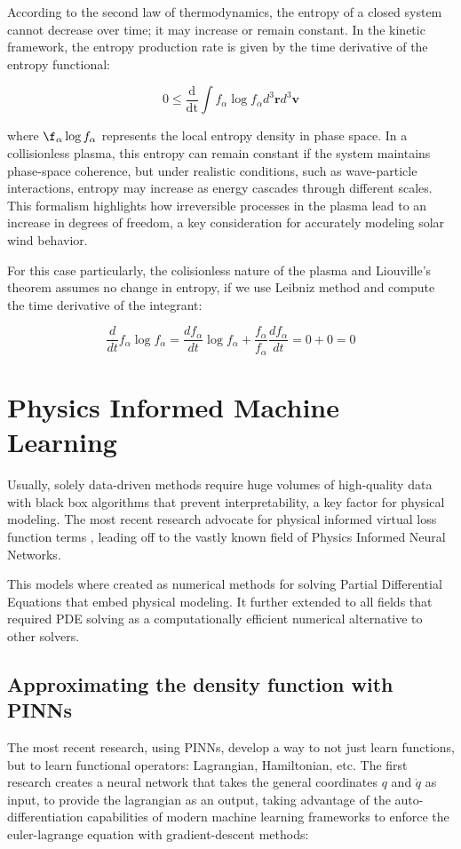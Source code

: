 \documentclass[12pt]{article}
\begin{document}
According to the second law of thermodynamics, the entropy of a closed system cannot decrease over time; it may increase or remain constant. In the kinetic framework, the entropy production rate is given by the time derivative of the entropy functional:

\begin{equation}
    0 \leq \frac{\mathrm{d}}{\mathrm{dt}} \int f_\alpha \log f_\alpha d^3\mathbf{r} d^3\mathbf{v}
\end{equation}

where $\f_\alpha \log f_\alpha$ represents the local entropy density in phase space. In a collisionless plasma, this entropy can remain constant if the system maintains phase-space coherence, but under realistic conditions, such as wave-particle interactions, entropy may increase as energy cascades through different scales. This formalism highlights how irreversible processes in the plasma lead to an increase in degrees of freedom, a key consideration for accurately modeling solar wind behavior.

For this case particularly, the colisionless nature of the plasma and Liouville's theorem assumes no change in entropy, if we use Leibniz method and compute the time derivative of the integrant:

\begin{equation}
    \frac{d}{dt} f_\alpha \log f_\alpha = \frac{df_\alpha}{dt} \log f_\alpha + \frac{f_\alpha}{f_\alpha}\frac{df_\alpha}{dt} = 0 + 0 = 0
\end{equation}

\section{Physics Informed Machine Learning}
Usually, solely data-driven methods require huge volumes of high-quality data with black box algorithms that prevent interpretability, a key factor for physical modeling. The most recent research advocate for physical informed virtual loss function terms \cite{}, leading off to the vastly known field of Physics Informed Neural Networks.

This models where created as numerical methods for solving Partial Differential Equations that embed physical modeling. It further extended to all fields that required PDE solving as a computationally efficient numerical alternative to other solvers.

\subsection{Approximating the density function with PINNs}
The most recent research, using PINNs, develop a way to not just learn functions, but to learn functional operators: Lagrangian, Hamiltonian, etc. \cite{cranmer2020lagrangianneuralnetworks, greydanus2019hamiltonianneuralnetworks} The first research creates a neural network that takes the general coordinates $q$ and $\dot q$ as input, to provide the lagrangian as an output, taking advantage of the auto-differentiation capabilities of modern machine learning frameworks to enforce the euler-lagrange equation with gradient-descent methods:
\end{document}
